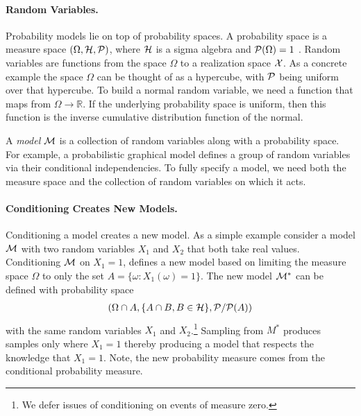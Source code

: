 


\paragraph{Random Variables.} Probability models lie on top of probability
spaces. A probability space is a measure space $(\Omega, {\cal H}, {\cal P})$,
where ${\cal H}$ is a sigma algebra and ${\cal P}(\Omega) = 1$ \citep{ccinlar2011probability}. Random variables are
functions from the space $\Omega$ to a realization space ${\cal X}$. As a concrete 
example the space $\Omega$ can be thought of as a hypercube, with ${\cal P}$ being
uniform over that hypercube. To build a normal random variable, we need a function
that maps from $\Omega \to \mathbb{R}$. If the underlying probability space is uniform, then
this function is the inverse cumulative distribution function of the normal. 

A \emph{model} ${\cal M}$ is a collection of random variables along with a probability space. 
For example, a probabilistic
graphical model defines a group of random variables via their conditional independencies.
To fully specify a model, we need both the measure space and the
collection of random variables on which it acts.

\paragraph{Conditioning Creates New Models.}
Conditioning a model
creates a new model. As a simple example consider a model ${\cal M}$ with two
random variables $X_1$ and $X_2$ that both take real values. Conditioning
${\cal M}$ on $X_1 = 1$, defines a new model based on limiting the measure space
$\Omega$ to only the set $A = \{ \omega : X_1(\omega) = 1\}$. 
The new model ${\cal M}^*$ can be defined with probability space
\begin{align*}
(\Omega \cap A, \{A \cap B, B \in {\cal H} \}, {\cal P} / {\cal P}(A)) 
\end{align*}
with the same random variables $X_1$ and $X_2$.\footnote{We defer issues of 
conditioning on events of measure zero.} Sampling from $M^*$ produces 
samples only where $X_1 = 1$ thereby producing a model that respects the 
knowledge that $X_1 = 1$. Note, the new probability measure comes
from the conditional probability measure.

